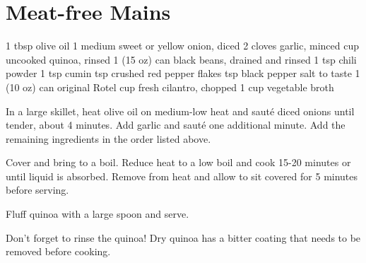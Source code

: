 \chapter{Meat-free Mains}
\begin{comment} %
We love meats, but meats are expensive,
sometimes making up as much as half the total
cost of our weekly grocery trip.
Vegetarian options can be as much about practicality
as about lifestyle choices.
\end{comment}

\vegan
{}
\begin{ingreds}
  1 tbsp olive oil
  1 medium sweet or yellow onion, diced
  2 cloves garlic, minced
   cup uncooked quinoa, rinsed
  1 (15 oz) can black beans, drained and rinsed
  1 tsp chili powder
  1 tsp cumin
   tsp crushed red pepper flakes
   tsp black pepper
  salt to taste
  1 (10 oz) can original Rotel
   cup fresh cilantro, chopped
  1  cup vegetable broth
\end{ingreds}

\begin{method}
  In a large skillet, heat olive oil on medium-low heat
  and saut\'e diced onions until tender, about 4 minutes.
  Add garlic and saut\'e one additional minute.
  Add the remaining ingredients in the order listed above.

  Cover and bring to a boil.
  Reduce heat to a low boil and cook 15-20 minutes
  or until liquid is absorbed.
  Remove from heat and allow to sit covered for 5 minutes before serving.

  Fluff quinoa with a large spoon and serve.
\end{method}
\begin{tips}
  Don't forget to rinse the quinoa!
  Dry quinoa has a bitter coating that needs
  to be removed before cooking.
\end{tips}
